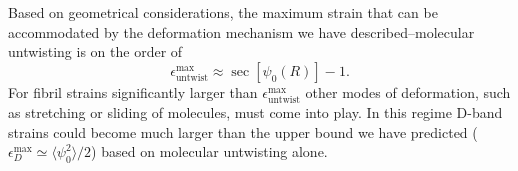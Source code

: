 









Based on geometrical considerations, the maximum strain that can be accommodated by the deformation mechanism we have described--molecular untwisting is on the order of
\begin{equation}\label{max_untwist_strain}
\epsilon_\mathrm{untwist}^\mathrm{max}\approx \sec\left[\psi_0(R)\right] -1.
\end{equation}
For fibril strains significantly larger than $\epsilon_\mathrm{untwist}^\mathrm{max}$ other modes of deformation, such as stretching or sliding of molecules, must come into play. In this regime D-band strains could become much larger than the upper bound we have predicted ($\epsilon_D^\mathrm{max} \simeq \langle\psi_0^2\rangle/2$) based on molecular untwisting alone.

